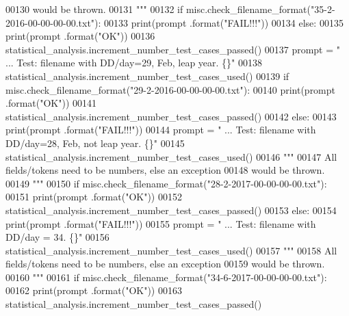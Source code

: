 \begin{DoxyCode}
00130 \textcolor{stringliteral}{                would be thrown.}
00131 \textcolor{stringliteral}{        """}
00132         \textcolor{keywordflow}{if} misc.check\_filename\_format(\textcolor{stringliteral}{"35-2-2016-00-00-00-00.txt"}):
00133             print(prompt .format(\textcolor{stringliteral}{"FAIL!!!"}))
00134         \textcolor{keywordflow}{else}:
00135             print(prompt .format(\textcolor{stringliteral}{"OK"}))
00136             statistical\_analysis.increment\_number\_test\_cases\_passed()
00137         prompt = \textcolor{stringliteral}{"  ... Test: filename with DD/day=29, Feb, leap year.  \{\}"}
00138         statistical\_analysis.increment\_number\_test\_cases\_used()
00139         \textcolor{keywordflow}{if} misc.check\_filename\_format(\textcolor{stringliteral}{"29-2-2016-00-00-00-00.txt"}):
00140             print(prompt .format(\textcolor{stringliteral}{"OK"}))
00141             statistical\_analysis.increment\_number\_test\_cases\_passed()
00142         \textcolor{keywordflow}{else}:
00143             print(prompt .format(\textcolor{stringliteral}{"FAIL!!!"}))
00144         prompt = \textcolor{stringliteral}{"  ... Test: filename with DD/day=28, Feb, not leap year.  \{\}"}
00145         statistical\_analysis.increment\_number\_test\_cases\_used()
00146         \textcolor{stringliteral}{"""}
00147 \textcolor{stringliteral}{            All fields/tokens need to be numbers, else an exception}
00148 \textcolor{stringliteral}{                would be thrown.}
00149 \textcolor{stringliteral}{        """}
00150         \textcolor{keywordflow}{if} misc.check\_filename\_format(\textcolor{stringliteral}{"28-2-2017-00-00-00-00.txt"}):
00151             print(prompt .format(\textcolor{stringliteral}{"OK"}))
00152             statistical\_analysis.increment\_number\_test\_cases\_passed()
00153         \textcolor{keywordflow}{else}:
00154             print(prompt .format(\textcolor{stringliteral}{"FAIL!!!"}))
00155         prompt = \textcolor{stringliteral}{"  ... Test: filename with DD/day = 34.            \{\}"}
00156         statistical\_analysis.increment\_number\_test\_cases\_used()
00157         \textcolor{stringliteral}{"""}
00158 \textcolor{stringliteral}{            All fields/tokens need to be numbers, else an exception}
00159 \textcolor{stringliteral}{                would be thrown.}
00160 \textcolor{stringliteral}{        """}
00161         \textcolor{keywordflow}{if} misc.check\_filename\_format(\textcolor{stringliteral}{"34-6-2017-00-00-00-00.txt"}):
00162             print(prompt .format(\textcolor{stringliteral}{"OK"}))
00163             statistical\_analysis.increment\_number\_test\_cases\_passed()

\end{DoxyCode}
